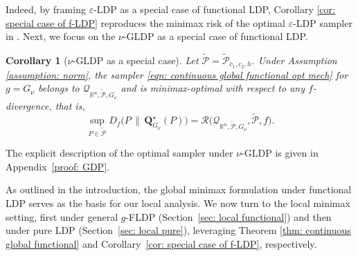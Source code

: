 \documentclass[accepted]{article}
\theoremstyle{plain} %
\newtheorem{corollary}[theorem]{Corollary}
\theoremstyle{definition}
\theoremstyle{remark}
\newcommand{\eps}{\varepsilon}
\newcommand{\bQ}{\mathbf{Q}}
\newcommand{\R}{\mathbb{R}}
\newcommand{\SA}[1]{\textbf{\textcolor{Magenta}{[#1]}}}
\newcommand{\HG}[1]{\textcolor{cyan}{[#1]}}
\begin{document}
Indeed, by framing $\eps$-LDP as a special case of functional LDP, Corollary \ref{cor: special case of f-LDP} reproduces the minimax risk of the optimal 
$\eps$-LDP sampler in \citep[Theorem 3.3]{park2024exactly}. %
Next, we focus on the $\nu$-GLDP as a special case of functional LDP. 
\begin{corollary}[$\nu$-GLDP as a special case]\label{cor: special case GDP}
Let \( \tilde{\mathcal{P}} = \tilde{\mathcal{P}}_{c_1, c_2, h} \).
Under Assumption \ref{assumption: norm}, the sampler  \eqref{eqn: continuous global functional opt mech} for $g=G_\nu$ belongs to $\mathcal{Q}_{\R^n, \tilde{\mathcal{P}}, G_\nu}$ and is minimax-optimal with respect to any $f$-divergence, that is,
\begin{equation}
    \sup_{P \in \tilde{\mathcal{P}}} D_f\big(P \, \| \, \bQ^\star_{G_\nu}(P)\big)
    = \mathcal{R}\big(\mathcal{Q}_{\R^n, \tilde{\mathcal{P}},G_\nu}, \tilde{\mathcal{P}}, f\big).
\end{equation}
\end{corollary}
The explicit description of the optimal sampler under $\nu$-GLDP is given in Appendix~\ref{proof: GDP}.

As outlined in the introduction, the global minimax formulation under functional LDP serves as the basis for our local analysis. We now turn to the local minimax setting, first under general  $g$-FLDP (Section~\ref{sec: local functional}) and then under pure LDP (Section~\ref{sec: local pure}), leveraging Theorem \ref{thm: continuous global functional} and Corollary~\ref{cor: special case of f-LDP}, respectively. 


\end{document}
